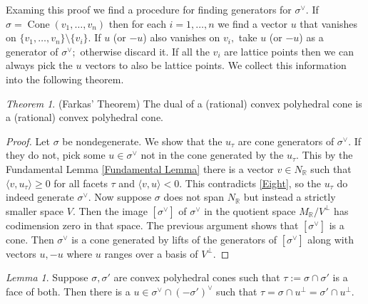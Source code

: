 \documentclass[BSc]{usydthesis}
\numberwithin{equation}{chapter}
\theoremstyle{remark}
\newtheorem{Theorem}[equation]{Theorem}
\newtheorem{Lemma}[equation]{Lemma}
\newcommand{\R}{\mathbb{R}}
\newcommand{\V}{\vee}
\DeclareMathOperator{\Cone}{Cone}
\begin{document}
Examing this proof we find a procedure for finding generators for $\sigma^{\V}.$ If $\sigma = \Cone(v_1, \ldots, v_n)$ then for each $i=1,\ldots, n$ we find a vector $u$ that vanishes on $\{v_1,\ldots, v_n\}\setminus\{v_i\}.$ If $u$ (or $-u$) also vanishes on $v_i,$ take $u$ (or $-u$) as a generator of $\sigma^{\V};$ otherwise discard it. If all the $v_i$ are lattice points then we can always pick the $u$ vectors to also be lattice points. We collect this information into the following theorem. 

\begin{Theorem}{(Farkas' Theorem)} \label{Dual is cone} The dual of a (rational) convex polyhedral cone is a (rational) convex polyhedral cone.  
\end{Theorem}
\begin{proof}
 Let $\sigma$ be nondegenerate. We show that the $u_{\tau}$ are cone generators of $\sigma^{\V}.$ If they do not, pick some $u\in \sigma^{\V}$ not in the cone generated by the $u_{\tau}.$ This by the Fundamental Lemma \ref{Fundamental Lemma} there is a vector $v\in N_{\R}$ such that $\langle v, u_{\tau} \rangle \geq 0$ for all facets $\tau$ and $\langle v, u \rangle < 0.$ This contradicts \ref{Eight}, so the $u_{\tau}$ do indeed generate $\sigma^{\V}.$ Now suppose $\sigma$ does not span $N_{\R}$ but instead a strictly smaller space $V.$ Then the image $[\sigma^{\V}]$ of $\sigma^{\V}$ in the quotient space $M_{\R}/V^{\perp}$ has codimension zero in that space. The previous argument shows that $[\sigma^{\V}]$ is a cone. Then $\sigma^{\V}$ is a cone generated by lifts of the generators of $[\sigma^{\V}]$ along with vectors $u,-u$ where $u$ ranges over a basis of $V^{\perp}.$ 
 
\end{proof}



\begin{Lemma}\label{Separation Strong}
Suppose $\sigma, \sigma'$ are convex polyhedral cones such that $\tau:= \sigma \cap \sigma'$ is a face of both. Then there is a $u\in \sigma^{\V} \cap (-\sigma')^{\V}$ such that $\tau = \sigma \cap u^{\perp} = \sigma' \cap u^{\perp}.$
\end{Lemma} 
\end{document}
